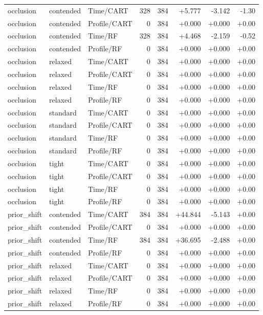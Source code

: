 \begin{longtable}{@{}lllrrrrr@{}}
occlusion & contended & Time/CART & 328 & 384 & +5.777 & -3.142 & -1.30\\
occlusion & contended & Profile/CART & 0 & 384 & +0.000 & +0.000 & +0.00\\
occlusion & contended & Time/RF & 328 & 384 & +4.468 & -2.159 & -0.52\\
occlusion & contended & Profile/RF & 0 & 384 & +0.000 & +0.000 & +0.00\\
occlusion & relaxed & Time/CART & 0 & 384 & +0.000 & +0.000 & +0.00\\
occlusion & relaxed & Profile/CART & 0 & 384 & +0.000 & +0.000 & +0.00\\
occlusion & relaxed & Time/RF & 0 & 384 & +0.000 & +0.000 & +0.00\\
occlusion & relaxed & Profile/RF & 0 & 384 & +0.000 & +0.000 & +0.00\\
occlusion & standard & Time/CART & 0 & 384 & +0.000 & +0.000 & +0.00\\
occlusion & standard & Profile/CART & 0 & 384 & +0.000 & +0.000 & +0.00\\
occlusion & standard & Time/RF & 0 & 384 & +0.000 & +0.000 & +0.00\\
occlusion & standard & Profile/RF & 0 & 384 & +0.000 & +0.000 & +0.00\\
occlusion & tight & Time/CART & 0 & 384 & +0.000 & +0.000 & +0.00\\
occlusion & tight & Profile/CART & 0 & 384 & +0.000 & +0.000 & +0.00\\
occlusion & tight & Time/RF & 0 & 384 & +0.000 & +0.000 & +0.00\\
occlusion & tight & Profile/RF & 0 & 384 & +0.000 & +0.000 & +0.00\\
prior\_shift & contended & Time/CART & 384 & 384 & +44.844 & -5.143 & +0.00\\
prior\_shift & contended & Profile/CART & 0 & 384 & +0.000 & +0.000 & +0.00\\
prior\_shift & contended & Time/RF & 384 & 384 & +36.695 & -2.488 & +0.00\\
prior\_shift & contended & Profile/RF & 0 & 384 & +0.000 & +0.000 & +0.00\\
prior\_shift & relaxed & Time/CART & 0 & 384 & +0.000 & +0.000 & +0.00\\
prior\_shift & relaxed & Profile/CART & 0 & 384 & +0.000 & +0.000 & +0.00\\
prior\_shift & relaxed & Time/RF & 0 & 384 & +0.000 & +0.000 & +0.00\\
prior\_shift & relaxed & Profile/RF & 0 & 384 & +0.000 & +0.000 & +0.00\\

\end{longtable}
